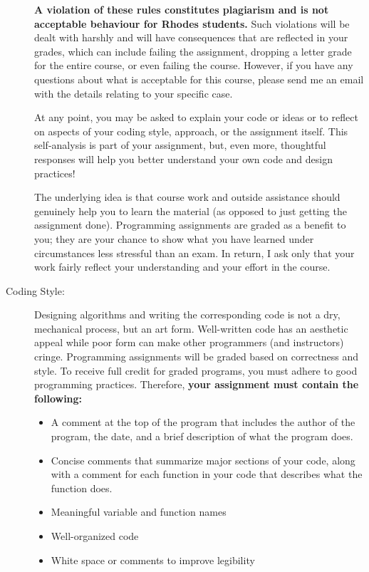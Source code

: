\documentclass [letterpaper,11pt]{article}
\begin{document}
\begin{description}
\textbf{A violation of these rules constitutes plagiarism and is not acceptable behaviour for Rhodes
students.} Such violations will be dealt with harshly and will have consequences that are
reflected in your grades, which can include failing the assignment, dropping a letter grade for
the entire course, or even failing the course. However, if you have any questions about what
is acceptable for this course, please send me an email with the details relating to your specific
case.

At any point, you may be asked to explain your code or ideas or to reflect on aspects of your
coding style, approach, or the assignment itself. This self-analysis is part of your assignment,
but, even more, thoughtful responses will help you better understand your own code and
design practices!

The underlying idea is that course work and outside assistance should genuinely help you to
learn the material (as opposed to just getting the assignment done). Programming assignments
are graded as a benefit to you; they are your chance to show what you have learned
under circumstances less stressful than an exam. In return, I ask only that your work fairly
reflect your understanding and your effort in the course.

\item[Coding Style:]
Designing algorithms and writing the corresponding code is not a dry, mechanical process, but an art form.  Well-written code has an aesthetic appeal while poor form can make other programmers (and instructors) cringe. Programming assignments will be graded based on correctness and style. To receive full credit for graded programs, you must adhere to good programming practices. Therefore, \textbf{your assignment must contain the following:}
\begin{itemize}\setlength{\itemsep}{0em}\setlength{\parskip}{0pt}
	\item A comment at the top of the program that includes the author of the program,
	the date, and a brief description of what the program does.
	\item Concise comments that summarize major sections of your code, along with a comment
	for each function in your code that describes what the function does.
	\item Meaningful variable and function names
	\item Well-organized code
	\item White space or comments to improve legibility
\end{itemize}


\end{description}
\end{document}
